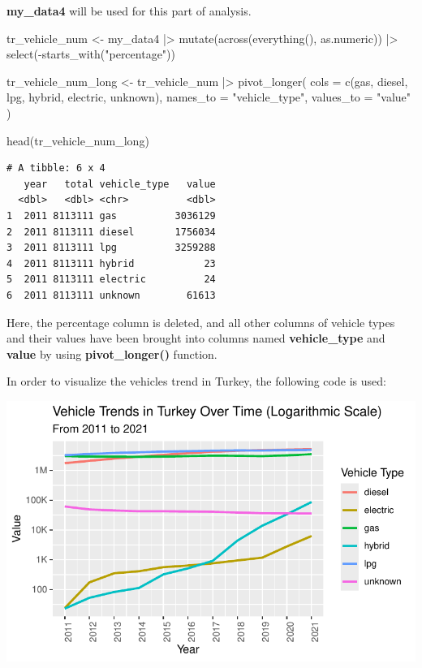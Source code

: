\documentclass[
  11pt,
  a4paper,
  DIV=11,
  numbers=noendperiod]{scrartcl}
\newenvironment{Shaded}{\begin{snugshade}}{\end{snugshade}}
\newcommand{\AttributeTok}[1]{\textcolor[rgb]{0.40,0.45,0.13}{#1}}
\newcommand{\FunctionTok}[1]{\textcolor[rgb]{0.28,0.35,0.67}{#1}}
\newcommand{\NormalTok}[1]{\textcolor[rgb]{0.00,0.23,0.31}{#1}}
\newcommand{\OtherTok}[1]{\textcolor[rgb]{0.00,0.23,0.31}{#1}}
\newcommand{\SpecialCharTok}[1]{\textcolor[rgb]{0.37,0.37,0.37}{#1}}
\newcommand{\StringTok}[1]{\textcolor[rgb]{0.13,0.47,0.30}{#1}}
\begin{document}
\textbf{my\_data4} will be used for this part of analysis.

\begin{Shaded}
\begin{Highlighting}[]
\NormalTok{tr\_vehicle\_num }\OtherTok{\textless{}{-}}\NormalTok{ my\_data4 }\SpecialCharTok{|\textgreater{}}
  \FunctionTok{mutate}\NormalTok{(}\FunctionTok{across}\NormalTok{(}\FunctionTok{everything}\NormalTok{(), as.numeric)) }\SpecialCharTok{|\textgreater{}}
  \FunctionTok{select}\NormalTok{(}\SpecialCharTok{{-}}\FunctionTok{starts\_with}\NormalTok{(}\StringTok{"percentage"}\NormalTok{))}

\NormalTok{tr\_vehicle\_num\_long }\OtherTok{\textless{}{-}}\NormalTok{ tr\_vehicle\_num }\SpecialCharTok{|\textgreater{}}
  \FunctionTok{pivot\_longer}\NormalTok{(}
    \AttributeTok{cols =} \FunctionTok{c}\NormalTok{(gas, diesel, lpg, hybrid, electric, unknown), }
    \AttributeTok{names\_to =} \StringTok{"vehicle\_type"}\NormalTok{, }
    \AttributeTok{values\_to =} \StringTok{"value"}        
\NormalTok{  )}

\FunctionTok{head}\NormalTok{(tr\_vehicle\_num\_long)}
\end{Highlighting}
\end{Shaded}

\begin{verbatim}
# A tibble: 6 x 4
   year   total vehicle_type   value
  <dbl>   <dbl> <chr>          <dbl>
1  2011 8113111 gas          3036129
2  2011 8113111 diesel       1756034
3  2011 8113111 lpg          3259288
4  2011 8113111 hybrid            23
5  2011 8113111 electric          24
6  2011 8113111 unknown        61613
\end{verbatim}

Here, the percentage column is deleted, and all other columns of vehicle
types and their values have been brought into columns named
\textbf{vehicle\_type} and \textbf{value} by using
\textbf{pivot\_longer()} function.

In order to visualize the vehicles trend in Turkey, the following code
is used:

\includegraphics{analysis_files/figure-pdf/unnamed-chunk-19-1.pdf}
\end{document}
